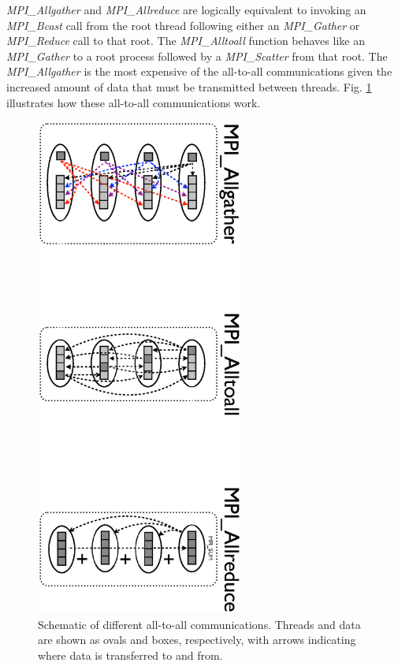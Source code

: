 \emph{MPI\_Allgather} and \emph{MPI\_Allreduce} are logically equivalent to
invoking an \emph{MPI\_Bcast} call from the root thread following either an
\emph{MPI\_Gather} or \emph{MPI\_Reduce} call to that root. The
\emph{MPI\_Alltoall} function behaves like an \emph{MPI\_Gather} to a root
process followed by a \emph{MPI\_Scatter} from that root. The
\emph{MPI\_Allgather} is the most expensive of the all-to-all communications
given the increased amount of data that must be transmitted between threads.
Fig. \ref{figC:AllToAll} illustrates how these all-to-all communications work.

\begin{figure}
   \includegraphics[height=6.5in, angle=90, trim=7.5cm 0cm 0cm 0cm, clip=true]
            {AllToAll.ps}
   \caption{Schematic of different all-to-all communications. Threads and data
            are shown as ovals and boxes, respectively, with arrows indicating
            where data is transferred to and from.}
   \label{figC:AllToAll}
\end{figure}

